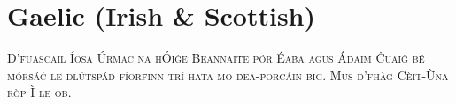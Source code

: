 

\presection\section*{\checkno Gaelic (Irish \& Scottish)}\postsection

\textsc{D’ḟuascail Íosa Úrṁac na hÓiġe Beannaiṫe pór Éaḃa agus Áḋaiṁ
Ċuaiġ bé ṁórṡáċ le dlúṫspád fíorḟinn trí hata mo ḋea-ṗorcáin ḃig.
Mus d’fhàg Cèit-Ùna ròp Ì le ob.}